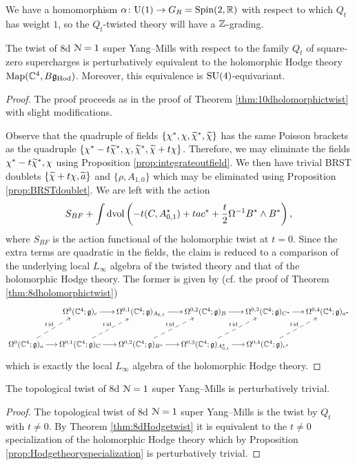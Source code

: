 \documentclass[10pt, oneside]{article}
\renewcommand{\U}{\mathrm{U}}
\begin{document}
We have a homomorphism $\alpha\colon \U(1)\rightarrow G_R=\Spin(2, \RR)$ with respect to which $Q_t$ has weight $1$, so the $Q_t$-twisted theory will have a $\mathbb Z$-grading.

\begin{theorem}
The twist of 8d $\mathcal N=1$ super Yang--Mills with respect to the family $Q_t$ of square-zero supercharges is perturbatively equivalent to the holomorphic Hodge theory $\operatorname{Map}(\mathbb C^4, B\mathfrak g_{\mathrm{Hod}})$. Moreover, this equivalence is $\mathrm{SU}(4)$-equivariant.
\label{thm:8dHodgetwist}
\end{theorem}
\begin{proof}
The proof proceeds as in the proof of Theorem \ref{thm:10dholomorphictwist} with slight modifications.

Observe that the quadruple of fields $\{\chi^*, \chi, \widetilde{\chi}^*, \widetilde{\chi}\}$ has the same Poisson brackets as the quadruple $\{\chi^*-t\widetilde{\chi}^*, \chi, \widetilde{\chi}^*, \widetilde{\chi} + t\chi\}$. Therefore, we may eliminate the fields $\chi^*-t\widetilde{\chi}^*, \chi$ using Proposition \ref{prop:integrateoutfield}. We then have trivial BRST doublets $\{\widetilde{\chi} + t\chi, \widetilde{a}\}$ and $\{\rho, A_{1, 0}\}$ which may be eliminated using Proposition \ref{prop:BRSTdoublet}. We are left with the action
\[S_{BF} + \int\operatorname{dvol}\left(-t(C, A_{0, 1}^*) + ta c^* + \frac{t}{2} \Omega^{-1} B^*\wedge B^*\right),\]
where $S_{BF}$ is the action functional of the holomorphic twist at $t=0$. Since the extra terms are quadratic in the fields, the claim is reduced to a comparison of the underlying local $L_\infty$ algebra of the twisted theory and that of the holomorphic Hodge theory. The former is given by (cf. the proof of Theorem \ref{thm:8dholomorphictwist})
\[
\xymatrix@C=0.5cm{
&\Omega^0(\CC^4; \gg)_c \ar[r] &\Omega^{0,1}(\CC^4; \gg)_{A_{0,1}} \ar[r] &\Omega^{0,2}(\CC^4; \gg)_{B} \ar[r] &\Omega^{0,3}(\CC^4; \gg)_{C^*} \ar[r] &\Omega^{0,4}(\CC^4; \gg)_{a^*} \\
\Omega^0(\CC^4; \gg)_a \ar[r] \ar@{-->}^{t\id}[ur] & \Omega^{0,1}(\CC^4; \gg)_C \ar[r] \ar@{-->}^{t\id}[ur] &\Omega^{0,2}(\CC^4; \gg)_{B^*} \ar[r] \ar@{-->}^{t\id}[ur] &\Omega^{0,3}(\CC^4; \gg)_{A_{0,1}^*} \ar[r] \ar@{-->}^{t\id}[ur] &\Omega^{0,4}(\CC^4; \gg)_{c^*} \ar@{-->}^{t\id}[ur] &
}
\]
which is exactly the local $L_\infty$ algebra of the holomorphic Hodge theory.
\end{proof}

\begin{corollary}
The topological twist of 8d $\mathcal N=1$ super Yang--Mills is perturbatively trivial.
\label{cor:8dtopologicaltwist}
\end{corollary}
\begin{proof}
The topological twist of 8d $\mathcal N=1$ super Yang--Mills is the twist by $Q_t$ with $t\neq 0$. By Theorem \ref{thm:8dHodgetwist} it is equivalent to the $t\neq 0$ specialization of the holomorphic Hodge theory which by Proposition \ref{prop:Hodgetheoryspecialization} is perturbatively trivial.
\end{proof}
\end{document}
